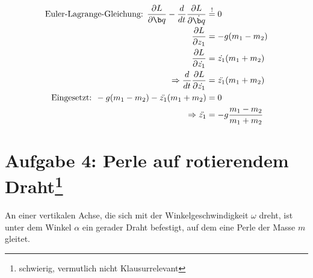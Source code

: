 \begin{enumeralph}
\begin{align*}
\text{Euler-Lagrange-Gleichung: } \frac{\partial L}{\partial\q}-\frac{d}{dt}\frac{\partial L}{\partial \dot{\q}}&\overset{!}{=}0\\
\frac{\partial L}{\partial z_1}&=-g(m_1-m_2)\\
\frac{\partial L}{\partial \dot{z_1}}&=\dot{z_1}(m_1+m_2)\\
\Rightarrow \frac{d}{dt}\frac{\partial L}{\partial \dot{z_1}}&=\ddot{z_1}(m_1+m_2)\\
\text{Eingesetzt: }-g(m_1-m_2)-\ddot{z_1}(m_1+m_2)&=0\\
\Rightarrow \ddot{z_1}&=-g\frac{m_1-m_2}{m_1+m_2}
\end{align*}
\end{enumeralph}

\section*{Aufgabe 4: Perle auf rotierendem Draht\footnote{schwierig, vermutlich nicht Klausurrelevant}}
An einer vertikalen Achse, die sich mit der Winkelgeschwindigkeit $\omega$ dreht, ist unter dem Winkel $\alpha$ ein gerader Draht befestigt, auf dem eine Perle der Masse $m$ gleitet.
